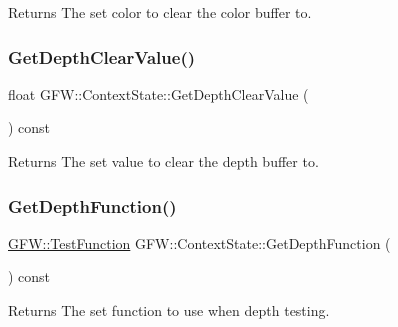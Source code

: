 \begin{DoxyReturn}{Returns}
The set color to clear the color buffer to. 
\end{DoxyReturn}
\mbox{\label{class_g_f_w_1_1_context_state_a807dad661c3be910ede6f15810210e15}} 
\subsubsection{\texorpdfstring{Get\+Depth\+Clear\+Value()}{GetDepthClearValue()}}
{\footnotesize\ttfamily float G\+F\+W\+::\+Context\+State\+::\+Get\+Depth\+Clear\+Value (\begin{DoxyParamCaption}{ }\end{DoxyParamCaption}) const}

\begin{DoxyReturn}{Returns}
The set value to clear the depth buffer to. 
\end{DoxyReturn}
\mbox{\label{class_g_f_w_1_1_context_state_ab07db17bd0d1ecc225e9e5902a5fbfdb}} 
\subsubsection{\texorpdfstring{Get\+Depth\+Function()}{GetDepthFunction()}}
{\footnotesize\ttfamily \hyperlink{namespace_g_f_w_a2eabb5a646179bceaab2d5e3bfce2316}{G\+F\+W\+::\+Test\+Function} G\+F\+W\+::\+Context\+State\+::\+Get\+Depth\+Function (\begin{DoxyParamCaption}{ }\end{DoxyParamCaption}) const}

\begin{DoxyReturn}{Returns}
The set function to use when depth testing. 
\end{DoxyReturn}
\mbox{\label{class_g_f_w_1_1_context_state_a07c2828b667abf5cb3539b89ba8328ff}} 
